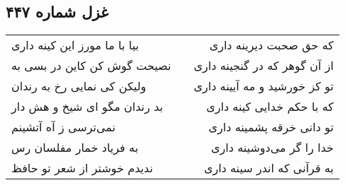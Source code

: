 \begin{center}
\section*{غزل شماره ۴۴۷}
\label{sec:sh447}
\begin{longtable}{l p{0.5cm} r}
بیا با ما مورز این کینه داری
&&
که حق صحبت دیرینه داری
\\
نصیحت گوش کن کاین در بسی به
&&
از آن گوهر که در گنجینه داری
\\
ولیکن کی نمایی رخ به رندان
&&
تو کز خورشید و مه آیینه داری
\\
بد رندان مگو ای شیخ و هش دار
&&
که با حکم خدایی کینه داری
\\
نمی‌ترسی ز آه آتشینم
&&
تو دانی خرقه پشمینه داری
\\
به فریاد خمار مفلسان رس
&&
خدا را گر می‌دوشینه داری
\\
ندیدم خوشتر از شعر تو حافظ
&&
به قرآنی که اندر سینه داری
\\
\end{longtable}
\end{center}
